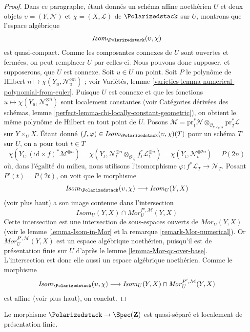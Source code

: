 \begin{proof}
\medskip\noindent
Dans ce paragraphe, étant donnés un schéma affine noethérien $U$ et deux
objets $\upsilon = (Y, \mathcal{N})$ et
$\chi = (X, \mathcal{L})$ de $\Polarizedstack$ sur $U$, montrons que
l'espace algébrique
$$
\mathit{Isom}_{\Polarizedstack}(\upsilon, \chi)
$$
est quasi-compact. Comme les composantes connexes de $U$ sont ouvertes et
fermées, on peut remplacer $U$ par celles-ci. Nous pouvons donc supposer,
et supposerons, que $U$ est connexe.
Soit $u \in U$ un point. Soit $P$ le polynôme de Hilbert
$n \mapsto \chi(Y_u, \mathcal{N}_u^{\otimes n})$ ; voir Variétés, lemme
\ref{varieties-lemma-numerical-polynomial-from-euler}.
Puisque $U$ est connexe et que les fonctions
$u \mapsto \chi(Y_u, \mathcal{N}_u^{\otimes n})$
sont localement constantes (voir Catégories dérivées des schémas, lemme
\ref{perfect-lemma-chi-locally-constant-geometric}), on obtient le même
polynôme de Hilbert en tout point de $U$. Posons
$\mathcal{M} = \text{pr}_1^*\mathcal{N}
\otimes_{\mathcal{O}_{Y \times_U X}} \text{pr}_2^*\mathcal{L}$
sur $Y \times_U X$. Étant donné
$(f, \varphi) \in \mathit{Isom}_{\Polarizedstack}(\upsilon, \chi)(T)$
pour un schéma $T$ sur $U$, on a pour tout $t \in T$
$$
\chi(Y_t, (\text{id} \times f)^*\mathcal{M}^{\otimes n}) =
\chi(Y_t,
\mathcal{N}_t^{\otimes n} \otimes_{\mathcal{O}_{Y_t}}
f_t^*\mathcal{L}_t^{\otimes n}) =
\chi(Y_t, \mathcal{N}_t^{\otimes 2n}) = P(2n)
$$
où, dans l'égalité du milieu, nous utilisons l'isomorphisme
$\varphi : f^*\mathcal{L}_T \to \mathcal{N}_T$.
Posant $P'(t) = P(2t)$, on voit que le morphisme
$$
\mathit{Isom}_{\Polarizedstack}(\upsilon, \chi)
\longrightarrow
\mathit{Isom}_U(Y, X)
$$
(voir plus haut) a son image contenue dans l'intersection
$$
\mathit{Isom}_U(Y, X) \cap \mathit{Mor}^{P', \mathcal{M}}_U(Y, X)
$$
Cette intersection est une intersection de sous-espaces ouverts de
$\mathit{Mor}_U(Y, X)$ (voir le lemme \ref{lemma-Isom-in-Mor} et la
remarque \ref{remark-Mor-numerical}).
Or $\mathit{Mor}^{P', \mathcal{M}}_U(Y, X)$ est un espace algébrique
noethérien, puisqu'il est de présentation finie sur $U$ d'après le lemme
\ref{lemma-Mor-qc-over-base}. L'intersection est donc elle aussi un espace
algébrique noethérien. Comme le morphisme
$$
\mathit{Isom}_{\Polarizedstack}(\upsilon, \chi)
\longrightarrow
\mathit{Isom}_U(Y, X) \cap \mathit{Mor}^{P', \mathcal{M}}_U(Y, X)
$$
est affine (voir plus haut), on conclut.
\end{proof}

\begin{lemma}
\label{lemma-polarized-qs-lfp}
Le morphisme $\Polarizedstack \to \Spec(\mathbf{Z})$ est quasi-séparé et
localement de présentation finie.
\end{lemma}

